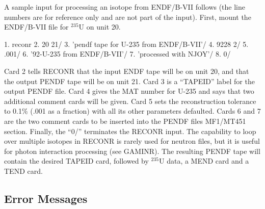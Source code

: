 \noindent
A sample input for processing an isotope from ENDF/B-VII
follows (the line numbers are for reference only and are not
part of the input).  First, mount the ENDF/B-VII file for
$^{235}$U on unit 20.

\small
\begin{ccode}

   1.  reconr
   2.  20 21/
   3.  'pendf tape for U-235 from ENDF/B-VII'/
   4.  9228 2/
   5.  .001/
   6.  '92-U-235 from ENDF/B-VII'/
   7.  'processed with NJOY'/
   8.  0/

\end{ccode}
\normalsize

Card 2 tells RECONR that the input ENDF tape will be
on unit 20, and that the output PENDF tape will be on unit 21.
Card 3 is a ``TAPEID'' label for the output PENDF file.
Card 4 gives the MAT number for U-235 and says that two
additional comment cards will be given.  Card 5 sets the
reconstruction tolerance to 0.1\% (.001 as a fraction)
with all its other parameters defaulted.  Cards 6 and 7
are the two comment cards to be inserted into the PENDF
files MF1/MT451 section.  Finally, the ``0/'' terminates the
RECONR input.  The capability to loop over multiple isotopes
in RECONR is rarely used for neutron files, but it is
useful for photon interaction processing (see GAMINR).
The resulting PENDF tape will contain the desired TAPEID
card, followed by $^{235}$U data, a MEND card and a TEND card.


\subsection{Error Messages}
\label{ssRECONR_msg}

